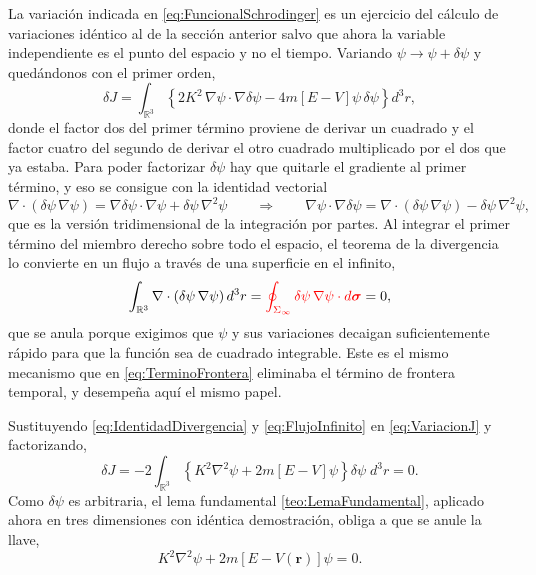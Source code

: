         La variación indicada en \eqref{eq:FuncionalSchrodinger} es un ejercicio del cálculo de variaciones idéntico al de la sección anterior salvo que ahora la variable independiente es el punto del espacio y no el tiempo. Variando $\psi\rightarrow\psi + \delta\psi$ y quedándonos con el primer orden,
        \begin{equation}\label{eq:VariacionJ}
            \delta J = \int_{\mathbb{R}^{3}}\left\{2K^{2}\,\nabla\psi\cdot\nabla\delta\psi - 4m\left[E-V\right]\psi\,\delta\psi\right\}d^{3}r,
        \end{equation}
        donde el factor dos del primer término proviene de derivar un cuadrado y el factor cuatro del segundo de derivar el otro cuadrado multiplicado por el dos que ya estaba. Para poder factorizar $\delta\psi$ hay que quitarle el gradiente al primer término, y eso se consigue con la identidad vectorial
        \begin{equation}\label{eq:IdentidadDivergencia}
            \nabla\cdot\left(\delta\psi\,\nabla\psi\right) = \nabla\delta\psi\cdot\nabla\psi + \delta\psi\,\nabla^{2}\psi
            \qquad\Longrightarrow\qquad
            \nabla\psi\cdot\nabla\delta\psi = \nabla\cdot\left(\delta\psi\,\nabla\psi\right) - \delta\psi\,\nabla^{2}\psi,
        \end{equation}
        que es la versión tridimensional de la integración por partes. Al integrar el primer término del miembro derecho sobre todo el espacio, el teorema de la divergencia lo convierte en un flujo a través de una superficie en el infinito,
        \begin{equation}\label{eq:FlujoInfinito}
            \int_{\mathbb{R}^{3}}\nabla\cdot\left(\delta\psi\,\nabla\psi\right)d^{3}r
            = \textcolor{red}{\oint_{\Sigma_{\infty}}\delta\psi\,\nabla\psi\cdot d\boldsymbol{\sigma}} = 0,
        \end{equation}
        que se anula porque exigimos que $\psi$ y sus variaciones decaigan suficientemente rápido para que la función sea de cuadrado integrable. Este es el mismo mecanismo que en \eqref{eq:TerminoFrontera} eliminaba el término de frontera temporal, y desempeña aquí el mismo papel.

        Sustituyendo \eqref{eq:IdentidadDivergencia} y \eqref{eq:FlujoInfinito} en \eqref{eq:VariacionJ} y factorizando,
        \begin{equation}\label{eq:VariacionJFactorizada}
            \delta J = -2\int_{\mathbb{R}^{3}}\left\{K^{2}\nabla^{2}\psi + 2m\left[E-V\right]\psi\right\}\delta\psi\;d^{3}r = 0 .
        \end{equation}
        Como $\delta\psi$ es arbitraria, el lema fundamental \ref{teo:LemaFundamental}, aplicado ahora en tres dimensiones con idéntica demostración, obliga a que se anule la llave,
        \begin{equation}\label{eq:SchrodingerConK}
            K^{2}\nabla^{2}\psi + 2m\left[E - V(\mathbf{r})\right]\psi = 0 .
        \end{equation}

